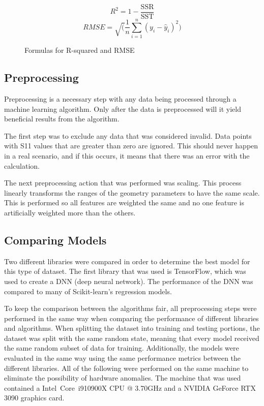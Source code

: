 \documentclass[lettersize,journal]{IEEEtran}
\begin{document}
\begin{figure}[h]
    \begin{equation}
        R^2 = 1 - \frac{\text{SSR}}{\text{SST}}
        \label{eq:rsquared}
    \end{equation}
    \begin{equation}
        {RMSE} = \sqrt(\frac{1}{n} \sum_{i=1}^{n}(y_i - \hat{y}_i)^2)
        \label{eq:rmse}
    \end{equation}
    \caption{Formulas for R-squared and RMSE}
\end{figure}


\subsection{Preprocessing}
Preprocessing is a necessary step with any data being processed through a machine learning algorithm. Only after the data is preprocessed will it yield beneficial results from the algorithm.

The first step was to exclude any data that was considered invalid. Data points with S11 values that are greater than zero are ignored. This should never happen in a real scenario, and if this occurs, it means that there was an error with the calculation. 

The next preprocessing action that was performed was scaling. This process linearly transforms the ranges of the geometry parameters to have the same scale. This is performed so all features are weighted the same and no one feature is artificially weighted more than the others.


\subsection{Comparing Models}
Two different libraries were compared in order to determine the best model for this type of dataset. The first library that was used is TensorFlow, which was used to create a DNN (deep neural network). The performance of the DNN was compared to many of Scikit-learn's regression models.

To keep the comparison between the algorithms fair, all preprocessing steps were performed in the same way when comparing the performance of different libraries and algorithms. When splitting the dataset into training and testing portions, the dataset was split with the same random state, meaning that every model received the same random subset of data for training. Additionally, the models were evaluated in the same way using the same performance metrics between the different libraries. All of the following were performed on the same machine to eliminate the possibility of hardware anomalies. The machine that was used contained a  Intel\textregistered~Core\texttrademark~i9\-10900X CPU @ 3.70GHz and a NVIDIA GeForce RTX 3090 graphics card. 
\end{document}
